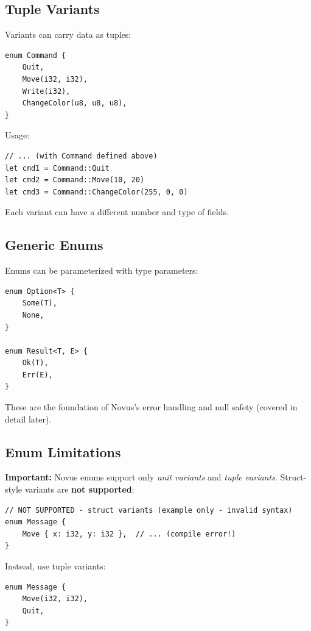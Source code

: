 \subsection{Tuple Variants}

Variants can carry data as tuples:

\begin{lstlisting}
enum Command {
    Quit,
    Move(i32, i32),
    Write(i32),
    ChangeColor(u8, u8, u8),
}
\end{lstlisting}

Usage:

\begin{lstlisting}
// ... (with Command defined above)
let cmd1 = Command::Quit
let cmd2 = Command::Move(10, 20)
let cmd3 = Command::ChangeColor(255, 0, 0)
\end{lstlisting}

Each variant can have a different number and type of fields.

\subsection{Generic Enums}

Enums can be parameterized with type parameters:

\begin{lstlisting}
enum Option<T> {
    Some(T),
    None,
}

enum Result<T, E> {
    Ok(T),
    Err(E),
}
\end{lstlisting}

These are the foundation of Novus's error handling and null safety (covered in detail later).

\subsection{Enum Limitations}

\textbf{Important:} Novus enums support only \textit{unit variants} and \textit{tuple variants}. Struct-style variants are \textbf{not supported}:

\begin{lstlisting}
// NOT SUPPORTED - struct variants (example only - invalid syntax)
enum Message {
    Move { x: i32, y: i32 },  // ... (compile error!)
}
\end{lstlisting}

Instead, use tuple variants:

\begin{lstlisting}
enum Message {
    Move(i32, i32),
    Quit,
}
\end{lstlisting}

